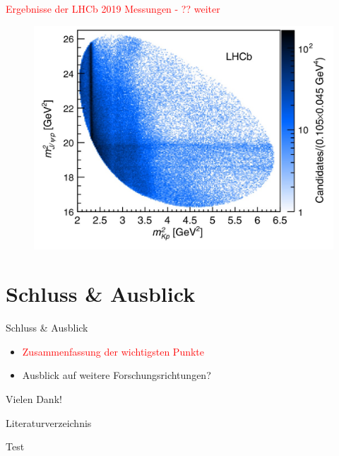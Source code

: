 \documentclass[aspectratio=169]{beamer} %
\begin{document}
\begin{frame}{\textcolor{red}{Ergebnisse der LHCb 2019 Messungen - ?? weiter}}
\begin{minipage}{0.48\textwidth}
          \begin{figure}\includegraphics[width=\textwidth]{Images/e4479e29-be8d-4b9c-bfc4-f1747ace3818.jpg}%
            \\\protect\cite[S.~2]{Aaij.2019}\end{figure}
        \end{minipage}
      \end{frame}
    
    \section{Schluss \& Ausblick}
    \begin{frame}{Schluss \& Ausblick}
      \begin{itemize}
        \item \textcolor{red}{Zusammenfassung der wichtigsten Punkte}
        \item Ausblick auf weitere Forschungsrichtungen?
      \end{itemize}
    \end{frame}

    \begin{frame}
      \begin{center}
          \Huge Vielen Dank!
      \end{center}
  \end{frame}

    \begin{frame}{Literaturverzeichnis}
   \printbibliography%
    \end{frame}

    \begin{frame}
        Test~\cite{Aaij.2015,Aaij.2019,C.Amsler.2017,GellMann.1964,Zweig.1964,Zweig.1964b}
    \end{frame}
\end{document}

